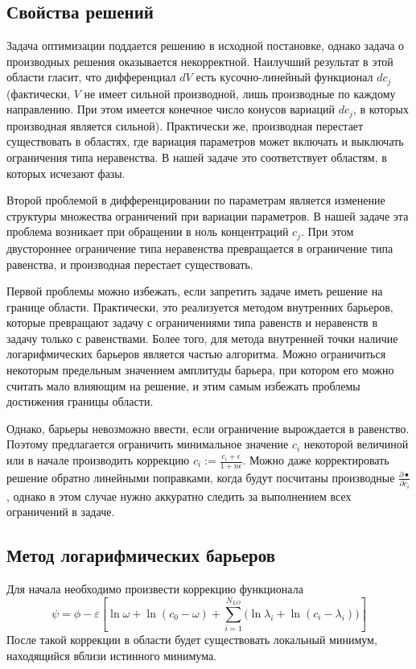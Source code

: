 \documentclass[12pt]{article}
\newcommand{\pd}[2]{\frac{\partial #1}{\partial #2}}
\begin{document}
\subsection{Свойства решений}

Задача оптимизации поддается решению в исходной постановке, однако задача о
производных решения оказывается некорректной. Наилучший результат в этой области
гласит, что дифференциал $dV$ есть кусочно-линейный функционал $dc_j$ (фактически,
$V$ не имеет сильной производной, лишь производные по каждому направлению. При
этом имеется конечное число конусов вариаций $dc_j$, в которых производная является сильной).
Практически же, производная перестает существовать в областях, где вариация
параметров может включать и выключать ограничения типа неравенства. В нашей
задаче это соответствует областям, в которых исчезают фазы.

Второй проблемой в дифференцировании по параметрам является изменение структуры
множества ограничений при вариации параметров. В нашей задаче эта проблема
возникает при обращении в ноль концентраций $c_j$. При этом двустороннее
ограничение типа неравенства превращается в ограничение типа равенства, и
производная перестает существовать.

Первой проблемы можно избежать, если запретить задаче иметь решение на границе
области. Практически, это реализуется методом внутренних барьеров, которые
превращают задачу с ограничениями типа равенств и неравенств в задачу только с
равенствами. Более того, для метода внутренней точки наличие логарифмических
барьеров является частью алгоритма. Можно ограничиться некоторым предельным
значением амплитуды барьера, при котором его можно считать мало влияющим на
решение, и этим самым избежать проблемы достижения границы области.

Однако, барьеры невозможно ввести, если ограничение вырождается в равенство.
Поэтому предлагается ограничить минимальное значение $c_i$ некоторой
величиной или в начале производить коррекцию $c_i := \frac{c_i + \epsilon}{1 +
n\epsilon}$. Можно даже корректировать решение обратно линейными поправками, когда будут
посчитаны производные $\pd{\bullet}{c_i}$, однако в этом случае нужно аккуратно
следить за выполнением всех ограничений в задаче.

\subsection{Метод логарифмических барьеров}

Для начала необходимо произвести коррекцию функционала 
\[
\psi = \phi - \varepsilon \left[
\ln \omega + \ln (c_0 - \omega) + 
\sum_{i=1}^{N_{LO}} \Big( \ln \lambda_i
+ \ln (c_i - \lambda_i) \Big) 
\right]
\]
После такой коррекции в области будет существовать локальный минимум,
находящийся вблизи истинного минимума.
\end{document}
